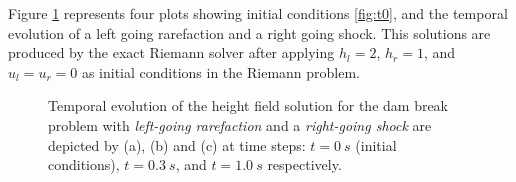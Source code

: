 \documentclass[10pt,a4paper]{article}
\begin{document}
	
	Figure \ref{hor2} represents four plots showing initial conditions \ref{fig:t0}, and the temporal evolution of a left going  rarefaction and a right going shock. This solutions are produced by the exact Riemann solver after applying $h_l = 2$, $h_r = 1$, and $u_l = u_r = 0$ as initial conditions in  the Riemann problem.
	
	\begin{figure}[H]
		\hfill
			\caption{Temporal evolution of the height field solution for the dam break problem with {\em left-going rarefaction} and a {\em right-going shock}  are depicted by (a), (b) and (c) at time steps: $t=0~s$ (initial conditions), $t = 0.3~s$, and $t = 1.0~s$ respectively.  }
		\label{hor2}
	\end{figure}
	
\end{document}
